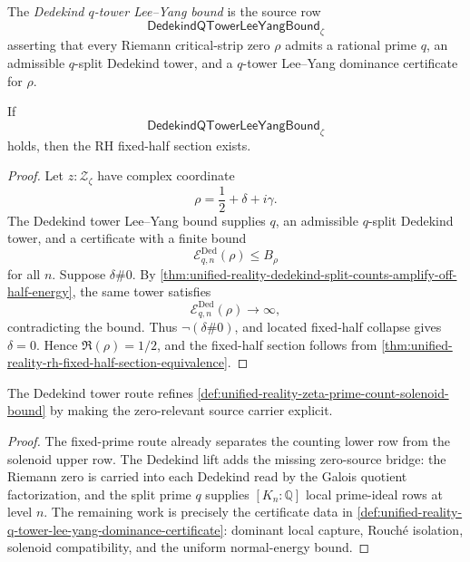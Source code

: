\begin{definition}
\label{def:unified-reality-dedekind-q-tower-lee-yang-bound}
The \emph{Dedekind $q$-tower Lee--Yang bound} is the source row
$$
\mathsf{DedekindQTowerLeeYangBound}_{\zeta}
$$
asserting that every Riemann critical-strip zero $\rho$ admits a
rational prime $q$, an admissible $q$-split Dedekind tower, and a
$q$-tower Lee--Yang dominance certificate for $\rho$.
\end{definition}

\begin{theorem}
\label{thm:unified-reality-dedekind-tower-lee-yang-bound-conditionally-sufficient}
If
$$
\mathsf{DedekindQTowerLeeYangBound}_{\zeta}
$$
holds, then the RH fixed-half section exists.
\end{theorem}

\begin{proof}
Let $z:\mathcal Z_{\zeta}$ have complex coordinate
$$
\rho=\frac12+\delta+i\gamma.
$$
The Dedekind tower Lee--Yang bound supplies $q$, an admissible
$q$-split Dedekind tower, and a certificate with a finite bound
$$
\mathcal E^{\mathrm{Ded}}_{q,n}(\rho)\le B_{\rho}
$$
for all $n$.  Suppose $\delta\#0$.  By
\autoref{thm:unified-reality-dedekind-split-counts-amplify-off-half-energy},
the same tower satisfies
$$
\mathcal E^{\mathrm{Ded}}_{q,n}(\rho)\to\infty,
$$
contradicting the bound.  Thus $\neg(\delta\#0)$, and located
fixed-half collapse gives $\delta=0$.  Hence $\Re(\rho)=1/2$, and the
fixed-half section follows from
\autoref{thm:unified-reality-rh-fixed-half-section-equivalence}.
\end{proof}

\begin{corollary}
\label{cor:unified-reality-dedekind-lift-zero-source-bridge}
The Dedekind tower route refines
\autoref{def:unified-reality-zeta-prime-count-solenoid-bound} by making
the zero-relevant source carrier explicit.
\end{corollary}


\begin{proof}
The fixed-prime route already separates the counting lower row from the
solenoid upper row.  The Dedekind lift adds the missing zero-source
bridge: the Riemann zero is carried into each Dedekind read by the
Galois quotient factorization, and the split prime $q$ supplies
$[K_n:\mathbb Q]$ local prime-ideal rows at level $n$.  The remaining
work is precisely the certificate data in
\autoref{def:unified-reality-q-tower-lee-yang-dominance-certificate}:
dominant local capture, Rouch\'e isolation, solenoid compatibility, and
the uniform normal-energy bound.
\end{proof}

